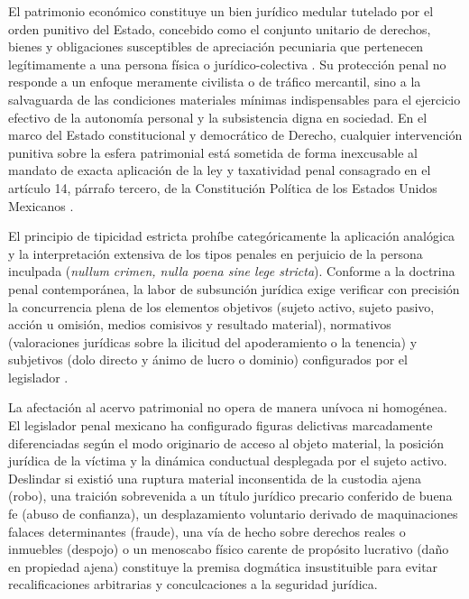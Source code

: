 \documentclass[spanish,letterpaper,oneside]{article}
\begin{document}
El patrimonio econ\'omico constituye un bien jur\'idico medular tutelado por el orden punitivo del Estado, concebido como el conjunto unitario de derechos, bienes y obligaciones susceptibles de apreciaci\'on pecuniaria que pertenecen leg\'itimamente a una persona f\'isica o jur\'idico-colectiva \citep{amuchateguiPenal2012,pavonVasconcelos2018}. Su protecci\'on penal no responde a un enfoque meramente civilista o de tr\'afico mercantil, sino a la salvaguarda de las condiciones materiales m\'inimas indispensables para el ejercicio efectivo de la autonom\'ia personal y la subsistencia digna en sociedad. En el marco del Estado constitucional y democr\'atico de Derecho, cualquier intervenci\'on punitiva sobre la esfera patrimonial est\'a sometida de forma inexcusable al mandato de exacta aplicaci\'on de la ley y taxatividad penal consagrado en el art\'iculo 14, p\'arrafo tercero, de la Constituci\'on Pol\'itica de los Estados Unidos Mexicanos \citep{cpeumAulaS3}.

El principio de tipicidad estricta proh\'ibe categ\'oricamente la aplicaci\'on anal\'ogica y la interpretaci\'on extensiva de los tipos penales en perjuicio de la persona inculpada (\emph{nullum crimen, nulla poena sine lege stricta}). Conforme a la doctrina penal contempor\'anea, la labor de subsunci\'on jur\'idica exige verificar con precisi\'on la concurrencia plena de los elementos objetivos (sujeto activo, sujeto pasivo, acci\'on u omisi\'on, medios comisivos y resultado material), normativos (valoraciones jur\'idicas sobre la ilicitud del apoderamiento o la tenencia) y subjetivos (dolo directo y \'animo de lucro o dominio) configurados por el legislador \citep{pavonVasconcelos2018}.

La afectaci\'on al acervo patrimonial no opera de manera un\'ivoca ni homog\'enea. El legislador penal mexicano ha configurado figuras delictivas marcadamente diferenciadas seg\'un el modo originario de acceso al objeto material, la posici\'on jur\'idica de la v\'ictima y la din\'amica conductual desplegada por el sujeto activo. Deslindar si existi\'o una ruptura material inconsentida de la custodia ajena (robo), una traici\'on sobrevenida a un t\'itulo jur\'idico precario conferido de buena fe (abuso de confianza), un desplazamiento voluntario derivado de maquinaciones falaces determinantes (fraude), una v\'ia de hecho sobre derechos reales o inmuebles (despojo) o un menoscabo f\'isico carente de prop\'osito lucrativo (da\~no en propiedad ajena) constituye la premisa dogm\'atica insustituible para evitar recalificaciones arbitrarias y conculcaciones a la seguridad jur\'idica.
\end{document}
